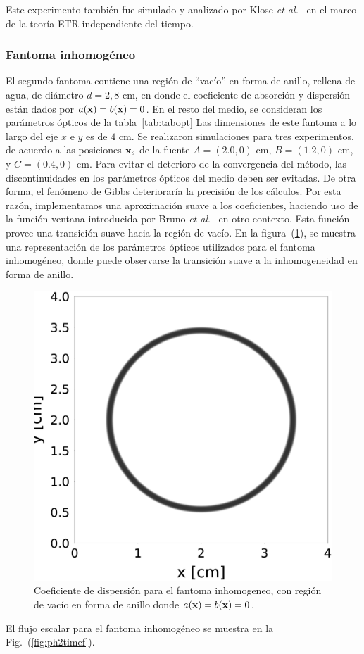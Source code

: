 Este experimento también fue simulado y analizado por Klose {\it et al.}~\cite{Klose2002}
en el marco de la teoría ETR independiente del tiempo.

\subsubsection{Fantoma inhomogéneo}

El segundo fantoma contiene una región de ``vacío'' en forma de anillo, 
rellena de agua, de diámetro $d=2,8$ cm, en donde el coeficiente de absorción 
y dispersión están dados por $a(\mathbf{x})=b(\mathbf{x})=0$. En el resto del medio, 
se consideran los parámetros ópticos de la tabla~\ref{tab:tabopt}
Las dimensiones de este fantoma a lo largo del eje $x$ e $y$ es de $4$ cm.
Se realizaron simulaciones para tres experimentos, de acuerdo a las posiciones 
$\mathbf{x}_s$ de la fuente $A=(2.0,0)$ cm, $B=(1.2,0)$ cm, 
y $C=(0.4,0)$ cm.
Para evitar el deterioro de la convergencia del método, las discontinuidades
 en los parámetros ópticos del medio 
deben ser evitadas. De otra forma, el fenómeno de Gibbs deterioraría 
la precisión de los cálculos. Por esta razón, implementamos una aproximación 
suave a los coeficientes, haciendo uso de la función ventana introducida 
por Bruno \textit{et al}.~\cite{Bruno2014a} en otro contexto. 
Esta función provee una transición suave hacia la región de 
vacío.
En la figura~(\ref{fig:scattcoef}), se muestra una representación de los 
parámetros ópticos utilizados para el fantoma inhomogéneo, 
donde puede observarse la transición suave a la inhomogeneidad 
en forma de anillo.
 \begin{figure}[h!]
\centering
  \includegraphics[width=0.35\linewidth]{figuras/sigs.eps}
  \caption{Coeficiente de dispersión para el fantoma inhomogeneo, 
  con región de vacío en forma de anillo donde  $a(\mathbf{x})=b(\mathbf{x})=0$.}
 \label{fig:scattcoef}
\end{figure}
El flujo escalar para el fantoma inhomogéneo se muestra en la Fig.~(\ref{fig:ph2timef}). 
